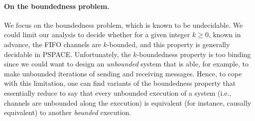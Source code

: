 \documentclass[a4paper,UKenglish,cleveref, autoref, thm-restate]{lipics-v2021}
\begin{document}
\paragraph*{On the boundedness problem.}
We focus on the  boundedness problem, which is known to be undecidable.  We could limit our analysis to decide whether for a given integer $k\geq 0$, known in advance, the FIFO channels are $k$-bounded, and this property is generally decidable in PSPACE. %
Unfortunately, the $k$-boundedness property is too binding since we could want to design an \emph{unbounded} system that is able, for example, to make unbounded iterations of sending  and receiving messages. Hence, to cope with this limitation, one can find
variants of the boundedness property that essentially reduce to say
that every unbounded execution of a system (i.e., channels are unbounded along the execution) is equi\-va\-lent (for instance, causally equivalent) to another \emph{bounded} execution.








\end{document}
